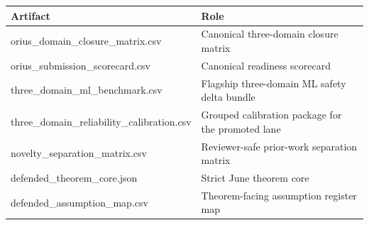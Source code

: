 \begin{tabular}{ll}Artifact & Role\\\midrule orius\_domain\_closure\_matrix.csv & Canonical three-domain closure matrix\\ orius\_submission\_scorecard.csv & Canonical readiness scorecard\\ three\_domain\_ml\_benchmark.csv & Flagship three-domain ML safety delta bundle\\ three\_domain\_reliability\_calibration.csv & Grouped calibration package for the promoted lane\\ novelty\_separation\_matrix.csv & Reviewer-safe prior-work separation matrix\\ defended\_theorem\_core.json & Strict June theorem core\\ defended\_assumption\_map.csv & Theorem-facing assumption register map\\\end{tabular}
